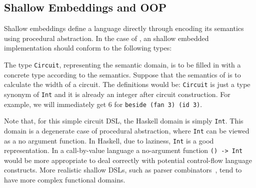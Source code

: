 \subsection{Shallow Embeddings and OOP}\label{subsec:shallow}
Shallow embeddings define a language directly through encoding its semantics
using procedural abstraction. In the case of \dsl,
an shallow embedded implementation should conform to the following
types:

The type \lstinline{Circuit}, representing the semantic domain, is to be filled in with a concrete type according to the semantics.
Suppose that the semantics of \dsl is to calculate the width of a
circuit. The definitions would be:
\lstinline{Circuit} is just a type
synonym of \lstinline{Int} and it is already an integer after circuit construction.
For example, we will immediately get $6$ for \lstinline{beside (fan 3) (id 3)}.

Note that, for this simple circuit DSL, the Haskell domain is simply
\lstinline{Int}. This domain is a degenerate case of
procedural abstraction, where \lstinline{Int} can be viewed 
as a no argument function. In Haskell, due to laziness, \lstinline{Int}
is a good representation. In a call-by-value language 
a no-argument function \lstinline{() -> Int} would be more
appropriate to deal correctly with potential control-flow 
language constructs. More realistic shallow DSLs, such as parser 
combinators~\cite{leijen01parsec}, tend to have more complex functional domains.

\begin{comment}

A simple rewriting of the previous program is to wrap the result into an
datatype, getting back the value through pattern matching:

\end{comment}

